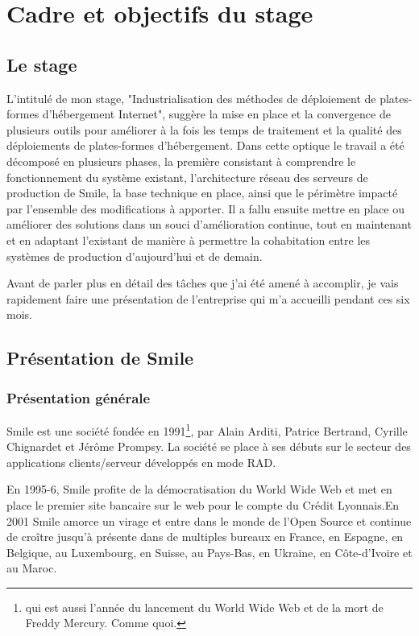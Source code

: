 \documentclass[14 pt,a4paper]{extreport}
\begin{document}
\section{Cadre et objectifs du stage}

\subsection{Le stage}L'intitulé de mon stage, "Industrialisation des méthodes de déploiement de plates-formes d'hébergement Internet", suggère la mise en place et la convergence de plusieurs outils pour améliorer à la fois les temps de traitement et la qualité des déploiements de plates-formes d'hébergement. Dans cette optique le travail a été décomposé en plusieurs phases, la première consistant à comprendre le fonctionnement du système existant, l'architecture réseau des serveurs de production de Smile, la base technique en place, ainsi que le périmètre impacté par l'ensemble des modifications à apporter. Il a fallu ensuite mettre en place ou améliorer des solutions dans un souci d'amélioration continue, tout en maintenant et en adaptant l'existant de manière à permettre la cohabitation entre les systèmes de production d'aujourd'hui et de demain.

Avant de parler plus en détail des tâches que j'ai été amené à accomplir, je vais rapidement faire une présentation de l'entreprise qui m'a accueilli pendant ces six mois.

\subsection{Présentation de Smile}

\subsubsection{Présentation générale}
Smile est une société fondée en 1991\footnote{qui est aussi l'année du lancement du World Wide Web et de la mort de Freddy Mercury. Comme quoi.}, par Alain Arditi, Patrice Bertrand, Cyrille Chignardet et Jérôme Prompsy. La société se place à ses débuts sur le secteur des applications clients/serveur développés en mode RAD.

En 1995-6, Smile profite de la démocratisation du World Wide Web et met en place le premier site bancaire sur le web pour le compte du Crédit Lyonnais.En 2001 Smile amorce un virage et entre dans le monde de l'Open Source et continue de croître jusqu'à présente dans de multiples bureaux en France, en Espagne, en Belgique, au Luxembourg, en Suisse, au Pays-Bas, en Ukraine, en Côte-d'Ivoire et au Maroc.
\end{document}
